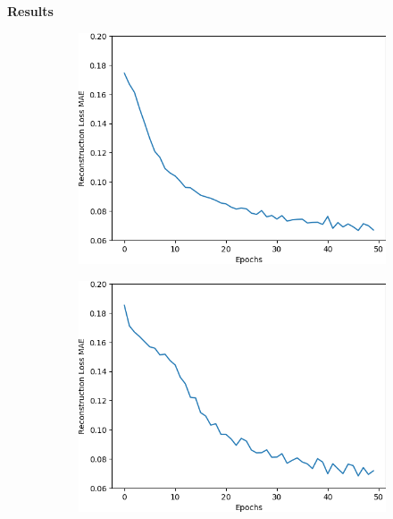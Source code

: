 \pagebreak
\textbf{Results}

\begin{figure}[H]
    \centering
    \begin{subfigure}{.25\textwidth}
        \centering
        \includegraphics[width=\textwidth]
        {images/figures/experiments_architecture/mae_graphKernel3maxPool16x16x32_dim1024.png}
        \caption{}
    \end{subfigure}%
    \begin{subfigure}{.25\textwidth}
        \centering
        \includegraphics[width=\textwidth]
        {images/figures/experiments_architecture/mae_graphKernel3maxPool16x16x64_dim1024.png}
        \caption{}
    \end{subfigure}%

\end{figure}
